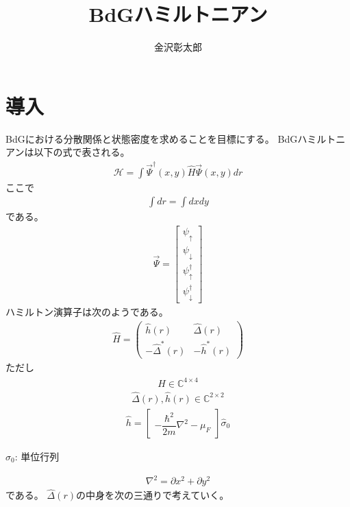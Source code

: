 \documentclass{jarticle}
\begin{document}
\title{BdGハミルトニアン}
\author{金沢彰太郎}
\maketitle

\tableofcontents
\newpage
\section{導入}
BdGにおける分散関係と状態密度を求めることを目標にする。
BdGハミルトニアンは以下の式で表される。
\begin{align}
\mathcal{H}=\int\vec{\Psi}^\dagger(x,y)\hat{H}\vec{\Psi}(x,y)dr
\end{align}
ここで
\begin{align}
\int{dr}=\int{dxdy}
\end{align}
である。
\begin{align}
\vec{\Psi}=\begin{bmatrix}
\psi_{\uparrow} \\
\psi_{\downarrow} \\
\psi_{\uparrow}^\dagger \\
\psi_{\downarrow}^\dagger
\end{bmatrix}
\end{align}
ハミルトン演算子は次のようである。
\begin{align}
\hat{H}=
\begin{pmatrix}
\hat{h}(r) & \hat{\Delta}(r) \\
-\hat{\Delta}^{*}(r) & -\hat{h}^{*}(r)
\end{pmatrix}
\end{align}
ただし
\begin{align}
\hat{H}\in\mathbb{C}^{4\times 4}
\end{align}
\begin{align}
\hat{\Delta}(r),\hat{h}(r)\in\mathbb{C}^{2\times 2}
\end{align}
\begin{align}
\hat{h}=
\begin{bmatrix}
-\dfrac{\hbar^2}{2m}\nabla^2-\mu_F
\end{bmatrix}
\hat{\sigma}_0
\end{align}
\begin{flushright}
	$\hat{\sigma}_0$: 単位行列
\end{flushright}
\begin{align}
\nabla^2=\partial x^2+\partial y^2
\end{align}
である。
$\hat{\Delta}(r)$の中身を次の三通りで考えていく。
\end{document}
